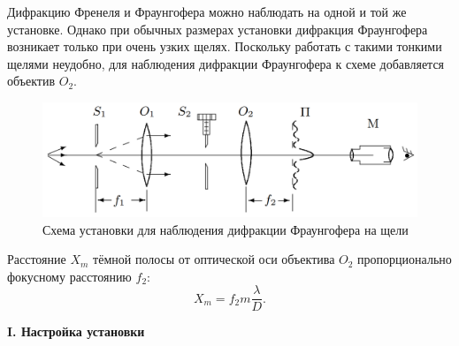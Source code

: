 \documentclass[a4paper,12pt]{article} %
\begin{document}
	Дифракцию Френеля и Фраунгофера можно наблюдать на одной и той же установке. Однако при обычных размерах установки дифракция Фраунгофера возникает только при очень узких щелях. Поскольку работать с такими тонкими щелями неудобно, для наблюдения дифракции Фраунгофера к схеме добавляется объектив $O_2$.
	\begin{figure}[h!]
		\centering
		\includegraphics[scale=0.5]{Pictures/Fraungofer}
		\caption{Схема установки для наблюдения дифракции Фраунгофера на щели}
	\end{figure}
	
	
	Расстояние $X_m$ тёмной полосы от оптической оси объектива $O_2$ пропорционально фокусному расстоянию $f_2$:
	\begin{equation*}
		X_m = f_2 m \frac{\lambda}{D}.
	\end{equation*}

	\begin{center}
		\textbf{I. Настройка установки}
	\end{center}
\end{document}
